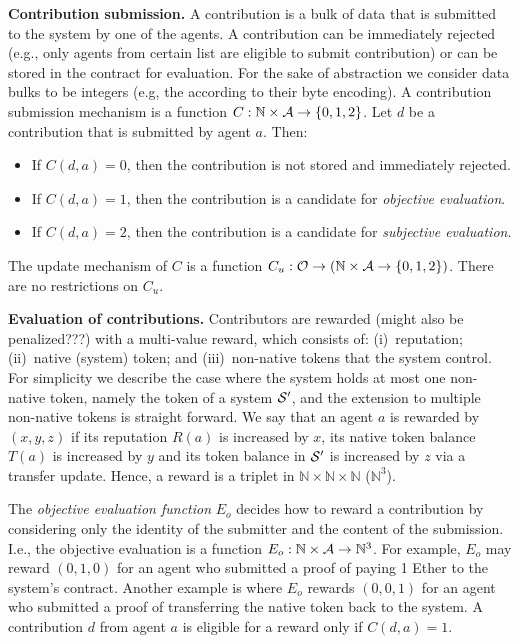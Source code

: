\documentclass[10pt]{llncs}
\newcommand{\nat}{\mathbb{N}}
\begin{document}
\noindent \textbf{Contribution submission.}
A contribution is a bulk of data that is submitted to the system by one of the agents.
A contribution can be immediately rejected (e.g., only agents from certain list are eligible to submit contribution) or can be stored in the contract for evaluation.
For the sake of abstraction we consider data bulks to be integers (e.g, the according to their byte encoding).
A contribution submission mechanism is a function $C: \nat \times \Agents \to \{0,1,2\}$.
Let $d$ be a contribution that is submitted by agent $a$.
Then:
\begin{itemize}
\item If $C(d,a) = 0$, then the contribution is not stored and immediately rejected.
\item If $C(d,a) = 1$, then the contribution is a candidate for \emph{objective evaluation}.
\item If $C(d,a) = 2$, then the contribution is a candidate for \emph{subjective evaluation}.
\end{itemize}
The update mechanism of $C$ is a function $C_u: \AgentOperations \to (\nat \times \Agents\to \{0,1,2\})$.
There are no restrictions on $C_u$.

\noindent \textbf{Evaluation of contributions.}
Contributors are rewarded (might also be penalized???) with a multi-value reward, which consists of:
(i)~reputation; (ii)~native (system) token; and (iii)~non-native tokens that the system control.
For simplicity we describe the case where the system holds at most one non-native token, namely the token of a system $\mathcal{S} '$, and the extension to multiple non-native tokens is straight forward.
We say that an agent $a$ is rewarded by $(x,y,z)$ if its reputation $R(a)$ is increased by $x$, its native token balance $T(a)$ is increased by $y$ and its token balance in $\mathcal{S} '$ is increased by $z$ via a transfer update.
Hence, a reward is a triplet in $\nat\times\nat\times\nat$ ($\nat ^ 3$).

The \emph{objective evaluation function} $E_o$ decides how to reward a contribution by considering only the identity of the submitter and the content of the submission.
I.e., the objective evaluation is a function $E_o : \nat \times \Agents \to \nat^3$.
For example, $E_o$ may reward $(0,1,0)$ for an agent who submitted a proof of paying 1 Ether to the system's contract.
Another example is where $E_o$ rewards $(0,0,1)$ for an agent who submitted a proof of transferring the native token back to the system.
A contribution $d$ from agent $a$ is eligible for a reward only if $C(d,a)=1$.
\end{document}
